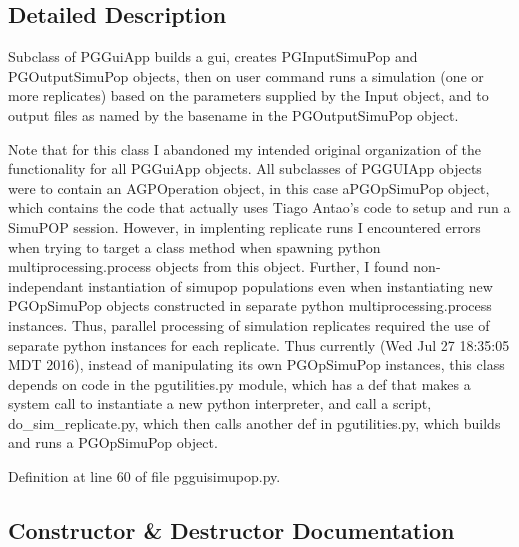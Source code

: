 \subsection{Detailed Description}
\begin{DoxyVerb}Subclass of PGGuiApp builds a gui,
creates PGInputSimuPop and PGOutputSimuPop
objects, then on user command runs a simulation 
(one or more replicates) based on the parameters 
supplied by the Input object, and to output files 
as named by the basename in the PGOutputSimuPop object.  

Note that for this class I abandoned my intended original 
organization of the functionality for all  PGGuiApp objects.
All subclasses of PGGUIApp objects were to contain an 
AGPOperation object, in this case aPGOpSimuPop object, 
which contains the code that actually uses Tiago Antao's 
code to setup and run a SimuPOP session.  However, in 
implenting replicate runs I encountered errors when
trying to target a class method when spawning python
multiprocessing.process objects from this object.  Further,
I found non-independant instantiation of simupop populations 
even when instantiating new PGOpSimuPop objects constructed
in separate python multiprocessing.process instances.   
Thus, parallel processing of simulation replicates required 
the use of separate python instances for each replicate. 
Thus currently (Wed Jul 27 18:35:05 MDT 2016),
instead of manipulating its own PGOpSimuPop instances,
this class depends on code in the pgutilities.py
module, which has a def that makes a system call to 
instantiate a new python interpreter, and call a script,
do_sim_replicate.py, which then calls another def in 
pgutilities.py, which builds and runs a PGOpSimuPop object.\end{DoxyVerb}
 

Definition at line 60 of file pgguisimupop.\+py.



\subsection{Constructor \& Destructor Documentation}
